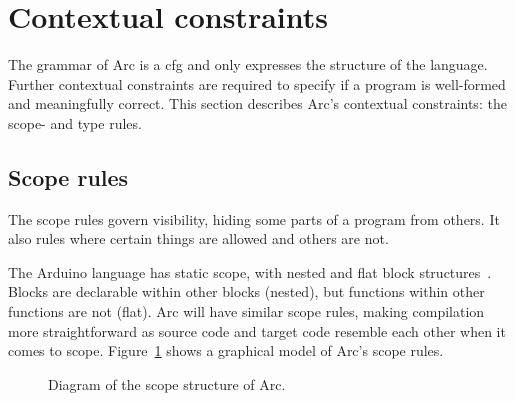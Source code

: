 \section{Contextual constraints}\label{sec:contextualconstraints}
The grammar of Arc is a \gls{cfg} and only expresses the structure of the language. Further contextual constraints are required to specify if a program is well-formed and meaningfully correct. This section describes Arc's contextual constraints: the scope- and type rules.

\subsection{Scope rules}\label{subsec:scoperules}
The scope rules govern visibility, hiding some parts of a program from others. It also rules where certain things are allowed and others are not.

The Arduino language has static scope, with nested and flat block structures~\cite{cppref}. Blocks are declarable within other blocks (nested), but functions within other functions are not (flat). Arc will have similar scope rules, making compilation more straightforward as source code and target code resemble each other when it comes to scope. Figure~\ref{fig:arcscoperules} shows a graphical model of Arc's scope rules.


\begin{figure}[htb!]
    \centering
    \caption{Diagram of the scope structure of Arc.}
    \label{fig:arcscoperules}
\end{figure}


